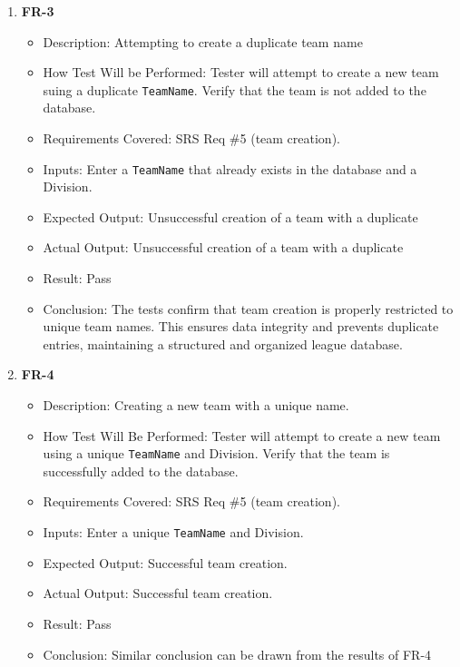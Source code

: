 \documentclass[12pt, titlepage]{article}
\begin{document}
\begin{enumerate}
       \item \textbf{FR-3}
          \begin{itemize}
              \item Description: Attempting to create a duplicate team name
              \item How Test Will be Performed: Tester will attempt to create a new team suing a duplicate \texttt{TeamName}. Verify that the team is not added to the database.
              \item Requirements Covered: SRS Req \#5 (team creation).
              \item Inputs: Enter a \texttt{TeamName} that already exists in the database and a Division.
              \item Expected Output: Unsuccessful creation of a team with a duplicate
              \item Actual Output: Unsuccessful creation of a team with a duplicate
              \item Result: Pass
              \item Conclusion: The tests confirm that team creation is properly restricted to unique team names.
			  This ensures data integrity and prevents duplicate entries, maintaining a structured and organized league database.
          \end{itemize}

      \item \textbf{FR-4}  
      \begin{itemize}
          \item Description: Creating a new team with a unique name.
          \item How Test Will Be Performed: Tester will attempt to create a new team using a unique \texttt{TeamName} and Division. Verify that the team is successfully added to the database.
          \item Requirements Covered: SRS Req \#5 (team creation).
          \item Inputs: Enter a unique \texttt{TeamName} and Division.
          \item Expected Output: Successful team creation.
          \item Actual Output: Successful team creation.
          \item Result: Pass
          \item Conclusion: Similar conclusion can be drawn from the results of FR-4
      \end{itemize}


\end{enumerate}
\end{document}
